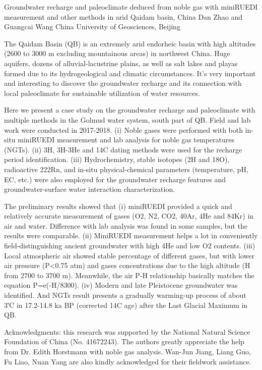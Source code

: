 \begin{conf-abstract}
{Groundwater recharge and paleoclimate deduced from noble gas with miniRUEDI measurement and other methods in arid Qaidam basin, China}
{Dan Zhao and Guangcai Wang}
{China University of Geosciences, Beijing}
{The Qaidam Basin (QB) is an extremely arid endorheic basin with high altitudes (2600 to 3000 m excluding mountainous areas) in northwest China. Huge aquifers, dozens of alluvial-lacustrine plains, as well as salt lakes and playas formed due to its hydrogeological and climatic circumstances. It’s very important and interesting to discover the groundwater recharge and its connection with local paleoclimate for sustainable utilization of water resources.

Here we present a case study on the groundwater recharge and paleoclimate with multiple methods in the Golmud water system, south part of QB. Field and lab work were conducted in 2017-2018. (i) Noble gases were performed with both in-situ miniRUEDI measurement and lab analysis for noble gas temperatures (NGTs). (ii) 3H, 3H-3He and 14C dating methods were used for the recharge period identification. (iii) Hydrochemistry, stable isotopes (2H and 18O), radioactive 222Rn, and in-situ physical-chemical parameters (temperature, pH, EC, etc.) were also employed for the groundwater recharge features and groundwater-surface water interaction characterization.

The preliminary results showed that (i) miniRUEDI provided a quick and relatively accurate measurement of gases (O2, N2, CO2, 40Ar, 4He and 84Kr) in air and water. Difference with lab analysis was found in some samples, but the results were comparable. (ii) MiniRUEDI measurement helps a lot in conveniently field-distinguishing ancient groundwater with high 4He and low O2 contents. (iii) Local atmospheric air showed stable percentage of different gases, but with lower air pressure (P<0.75 atm) and gases concentrations due to the high altitude (H from 2700 to 3700 m). Meanwhile, the air P-H relationship basically matches the equation P=e(-H/8300). (iv) Modern and late Pleistocene groundwater was identified. And NGTs result presents a gradually warming-up process of about 3℃ in 17.2-14.8 ka BP (corrected 14C age) after the Last Glacial Maximum in QB.

Acknowledgments: this research was supported by the National Natural Science Foundation of China (No. 41672243). The authors greatly appreciate the help from Dr. Edith Horstmann with noble gas analysis. Wan-Jun Jiang, Liang Guo, Fu Liao, Nuan Yang are also kindly acknowledged for their fieldwork assistance.}
\end{conf-abstract}
